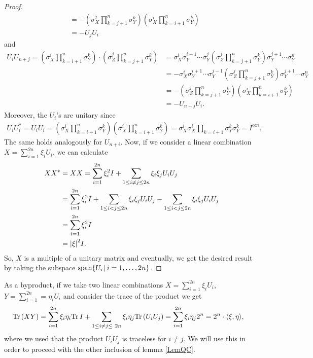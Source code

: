 \begin{proof}
\begin{align*}
&= - ( \sigma_X^j \prod_{k = j+1}^{n}\sigma_Y^k)(\sigma_X^i \prod_{k = i+1}^{n}\sigma_Y^k)  \\
&= -U_jU_i
\end{align*}
and 
\begin{align*}
U_iU_{n+j} =  (\sigma_X^i \prod_{k = i+1}^{n}\sigma_Y^k) \cdot( \sigma_Z^j \prod_{k = j+1}^{n}\sigma_Y^k) &=
\sigma_X^i \sigma_Y^{i+1} \cdots \sigma_Y^j ( \sigma_Z^j \prod_{k = j+1}^{n}\sigma_Y^k) \sigma_Y^{j+1} \cdots \sigma_Y^n \\
&= - \sigma_X^i \sigma_Y^{i+1} \cdots \sigma_Y^{j-1} ( \sigma_Z^j \prod_{k = j+1}^{n}\sigma_Y^k) \sigma_Y^{j+1} \cdots \sigma_Y^n  \\
&= - ( \sigma_Z^j \prod_{k = j+1}^{n}\sigma_Y^k)(\sigma_X^i \prod_{k = i+1}^{n}\sigma_Y^k)  \\
&= -U_{n+j}U_i.
\end{align*}
Moreover, the $ U_i $'s are unitary since 
\begin{align*} 
U_iU_i^* =U_iU_i=  ( \sigma_X^i \prod_{k = i+1}^{n}\sigma_Y^k)( \sigma_X^i \prod_{k = i+1}^{n}\sigma_Y^k)= \sigma_X^i\sigma_X^i \prod_{k = i+1} \sigma_Y^k \sigma_Y^k = I^{\otimes n}.
\end{align*}
The same holds analogously for $ U_{n+i} $.
Now, if we consider a linear combination $ X = \sum_{i = 1}^{2n}\xi_i U_i$, we can calculate 
\begin{align*}
XX^* &= XX = \sum_{i = 1}^{2n} \xi_i^2 I + \sum_{1 \le i\neq j \le  2n}\xi_i\xi_j U_i U_j   \\
&= \sum_{i = 1}^{2n} \xi_i^2 I + \sum_{1 \le i < j \le  2n}\xi_i\xi_jU_iU_j - \sum_{1 \le i < j \le  2n}\xi_i\xi_jU_iU_j \\
&=\sum_{i = 1}^{2n} \xi_i^2 I \\
&= {\left|{\xi}\right|}^2 I.
\end{align*}
So, $ X $ is a multiple of a unitary matrix and eventually, we get the desired result by taking the subspace $ \textup{span} \{ U_i \, | \, i = 1,\hdots,2n \} $.

\end{proof}
As a byproduct, if we take two linear combinations $ X = \sum_{i = 1}^{2n}\xi_i U_i$, $ Y = \sum_{i = 1}^{2n} = \eta_iU_i $ and consider the trace of the product we get
\begin{align}\label{traceUi}
	\textup{Tr} \, {(XY)}  &= \sum_{i = 1}^{2n} \xi_i \eta_i  \textup{Tr} \, {I}  + \sum_{1 \le i \neq j \le \ 2n}\xi_i\eta_j \textup{Tr} \, {(U_i U_j)}   = \sum_{i= 1}^{2n}\xi_i \eta_j 2^n = 2^n \cdot \langle \xi, \eta \rangle,
\end{align}
where we used that the product $ U_iU_j $ is traceless for $ i \neq j $.
We will use this in order to proceed with the other inclusion of lemma \ref{LemQC}.

